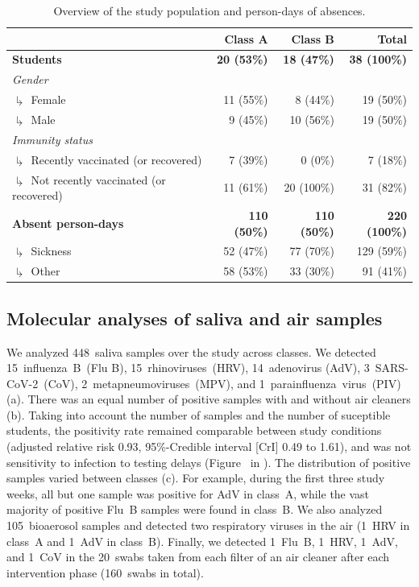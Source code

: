 \documentclass[fleqn,11pt]{wlscirep}
\begin{document}
\begin{table}[!htpb]
    \centering
    \caption{Overview of the study population and person-days of absences.}
    \label{tab:cases-overview-school}
    \footnotesize
    \begin{tabular}{l r r r}
    \toprule
         &  Class A & Class B & Total \\ \midrule 
        \textbf{Students} & \textbf{20 (53\%)} & \textbf{18 (47\%)} & \textbf{38 (100\%)} \\
        \emph{Gender} \\
        $\drsh$ Female & 11 (55\%) & 8 (44\%) & 19 (\hphantom{0}50\%) \\
        $\drsh$ Male & 9 (45\%) & 10 (56\%) & 19 (\hphantom{0}50\%) \\
        \emph{Immunity status} \\
        $\drsh$ Recently vaccinated (or recovered) & 7 (39\%) & 0 (0\%) & 7 (\hphantom{0}18\%) \\
        $\drsh$ Not recently vaccinated (or recovered) & 11 (61\%) & 20 (100\%) & 31 (\hphantom{0}82\%) \\
        \textbf{Absent person-days} & \textbf{110 (50\%)} & \textbf{110 (50\%)} & \textbf{220 (100\%)} \\
        $\drsh$ Sickness & 52 (47\%) & 77 (70\%) & 129 (\hphantom{0}59\%) \\
        $\drsh$ Other & 58 (53\%) & 33 (30\%) & 91 (\hphantom{0}41\%) \\
        \bottomrule
    \end{tabular} 
\end{table}

\subsection{Molecular analyses of saliva and air samples}

We analyzed 448~saliva samples over the study across classes. We detected 15~influenza~B~(Flu B), 15~rhinoviruses~(HRV), 14~adenovirus (AdV), 3~SARS-CoV-2~(CoV), 2~metapneumoviruses~(MPV), and 1~parainfluenza~virus~(PIV) (a). There was an equal number of positive samples with and without air cleaners (b). Taking into account the number of samples and the number of suceptible students, the positivity rate remained comparable between study conditions (adjusted relative risk 0.93, 95\%-Credible interval [CrI] 0.49 to 1.61), and was not sensitivity to infection to testing delays (Figure~ in \supp). The distribution of positive samples varied between classes (c). For example, during the first three study weeks, all but one sample was positive for AdV in class~A, while the vast majority of positive Flu~B samples were found in class~B. We also analyzed 105~bioaerosol samples and detected  two respiratory viruses in the air (1~HRV in class~A and 1~AdV in class~B). Finally, we detected 1~Flu~B, 1~HRV, 1~AdV, and 1~CoV in the 20~swabs taken from each filter of an air cleaner after each intervention phase (160~swabs in total).
\end{document}
